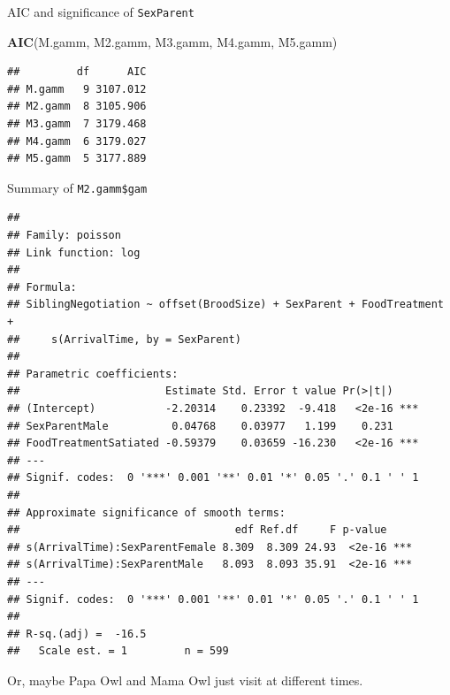 \documentclass[
  ignorenonframetext,
]{beamer}
\newenvironment{Shaded}{\begin{snugshade}}{\end{snugshade}}
\newcommand{\KeywordTok}[1]{\textcolor[rgb]{0.13,0.29,0.53}{\textbf{#1}}}
\newcommand{\NormalTok}[1]{#1}
\begin{document}
\begin{frame}[fragile]{AIC and significance of \texttt{SexParent}}
\scriptsize

\begin{Shaded}
\begin{Highlighting}[]
\KeywordTok{AIC}\NormalTok{(M.gamm, M2.gamm, M3.gamm, M4.gamm, M5.gamm)}
\end{Highlighting}
\end{Shaded}

\begin{verbatim}
##         df      AIC
## M.gamm   9 3107.012
## M2.gamm  8 3105.906
## M3.gamm  7 3179.468
## M4.gamm  6 3179.027
## M5.gamm  5 3177.889
\end{verbatim}

\end{frame}

\begin{frame}[fragile]{Summary of \texttt{M2.gamm\$gam}}
\protect\hypertarget{summary-of-m2.gammgam}{}

\tiny

\begin{verbatim}
## 
## Family: poisson 
## Link function: log 
## 
## Formula:
## SiblingNegotiation ~ offset(BroodSize) + SexParent + FoodTreatment + 
##     s(ArrivalTime, by = SexParent)
## 
## Parametric coefficients:
##                       Estimate Std. Error t value Pr(>|t|)    
## (Intercept)           -2.20314    0.23392  -9.418   <2e-16 ***
## SexParentMale          0.04768    0.03977   1.199    0.231    
## FoodTreatmentSatiated -0.59379    0.03659 -16.230   <2e-16 ***
## ---
## Signif. codes:  0 '***' 0.001 '**' 0.01 '*' 0.05 '.' 0.1 ' ' 1
## 
## Approximate significance of smooth terms:
##                                  edf Ref.df     F p-value    
## s(ArrivalTime):SexParentFemale 8.309  8.309 24.93  <2e-16 ***
## s(ArrivalTime):SexParentMale   8.093  8.093 35.91  <2e-16 ***
## ---
## Signif. codes:  0 '***' 0.001 '**' 0.01 '*' 0.05 '.' 0.1 ' ' 1
## 
## R-sq.(adj) =  -16.5   
##   Scale est. = 1         n = 599
\end{verbatim}

Or, maybe Papa Owl and Mama Owl just visit at different times.

\end{frame}
\end{document}
